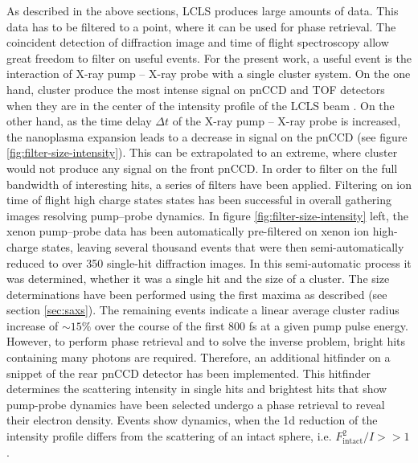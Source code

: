 As described in the above sections, LCLS produces large amounts of data. This data has to be filtered to a point, where it can be used for phase retrieval. The coincident detection of diffraction image and time of flight spectroscopy allow great freedom to filter on useful events. For the present work, a useful event is the interaction of X-ray pump -- X-ray probe with a single cluster system. On the one hand, cluster produce the most intense signal on pnCCD and TOF detectors when they are in the center of the intensity profile of the LCLS beam \citep{Gorkhover-2012-PRL}. On the other hand, as the time delay $\Delta t$ of the X-ray pump -- X-ray probe is increased, the nanoplasma expansion leads to a decrease in signal on the pnCCD (see figure \ref{fig:filter-size-intensity}). This can be extrapolated to an extreme, where cluster would not produce any signal on the front pnCCD. In order to filter on the full bandwidth of interesting hits, a series of filters have been applied. Filtering on ion time of flight high charge states states has been successful in overall gathering images resolving pump--probe dynamics. In figure \ref{fig:filter-size-intensity} left, the xenon pump--probe data has been automatically pre-filtered on xenon ion high-charge states, leaving several thousand events that were then semi-automatically reduced to over 350 single-hit diffraction images. In this semi-automatic process it was determined, whether it was a single hit and the size of a cluster. The size determinations have been performed using the first maxima as described (see section \ref{sec:saxs}). The remaining events indicate a linear average cluster radius increase of $\sim15\%$ over the course of the first 800 fs at a given pump pulse energy. However, to perform phase retrieval and to solve the inverse problem, bright hits containing many photons are required. Therefore, an additional hitfinder on a snippet of the rear pnCCD detector has been implemented. This hitfinder determines the scattering intensity in single hits and brightest hits that show pump-probe dynamics have been selected undergo a phase retrieval to reveal their electron density. Events show dynamics, when the 1d reduction of the intensity profile differs from the scattering of an intact sphere, i.e. $F_{\text{intact}}^{2}/I >> 1$.
%
%
%
